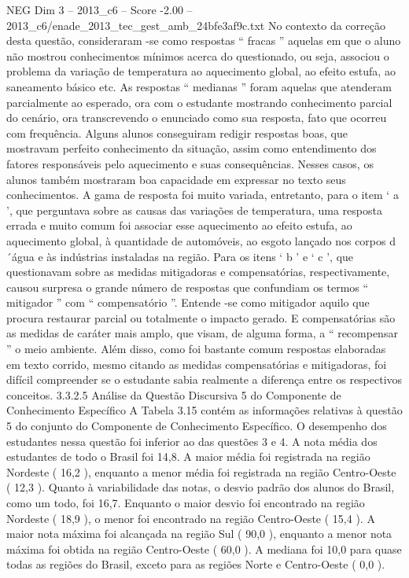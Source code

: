 \begin{textsample}{NEG Dim 3 – 2013\_c6 – Score -2.00 – 2013\_c6/enade\_2013\_tec\_gest\_amb\_24bfe3af9c.txt}
No contexto da correção desta questão, consideraram -se como respostas “ fracas ” aquelas em que o aluno não mostrou conhecimentos mínimos acerca do questionado, ou seja, associou o problema da variação de temperatura ao aquecimento global, ao efeito estufa, ao saneamento básico etc.
As respostas “ medianas ” foram aquelas que atenderam parcialmente ao esperado, ora com o estudante mostrando conhecimento parcial do cenário, ora transcrevendo o enunciado como sua resposta, fato que ocorreu com frequência.
Alguns alunos conseguiram redigir respostas boas, que mostravam perfeito conhecimento da situação, assim como entendimento dos fatores responsáveis pelo aquecimento e suas consequências.
Nesses casos, os alunos também mostraram boa capacidade em expressar no texto seus conhecimentos.
A gama de resposta foi muito variada, entretanto, para o item ‘ a ’, que perguntava sobre as causas das variações de temperatura, uma resposta errada e muito comum foi associar esse aquecimento ao efeito estufa, ao aquecimento global, à quantidade de automóveis, ao esgoto lançado nos corpos d´água e às indústrias instaladas na região.
Para os itens ‘ b ’ e ‘ c ’, que questionavam sobre as medidas mitigadoras e compensatórias, respectivamente, causou surpresa o grande número de respostas que confundiam os termos “ mitigador ” com “ compensatório ”.
Entende -se como mitigador aquilo que procura restaurar parcial ou totalmente o impacto gerado.
E compensatórias são as medidas de caráter mais amplo, que visam, de alguma forma, a “ recompensar ” o meio ambiente.
Além disso, como foi bastante comum respostas elaboradas em texto corrido, mesmo citando as medidas compensatórias e mitigadoras, foi difícil compreender se o estudante sabia realmente a diferença entre os respectivos conceitos. 3.3.2.5 Análise da Questão Discursiva 5 do Componente de Conhecimento Específico A Tabela 3.15 contém as informações relativas à questão 5 do conjunto do Componente de Conhecimento Específico.
O desempenho dos estudantes nessa questão foi inferior ao das questões 3 e 4.
A nota média dos estudantes de todo o Brasil foi 14,8.
A maior média foi registrada na região Nordeste ( 16,2 ), enquanto a menor média foi registrada na região Centro-Oeste ( 12,3 ).
Quanto à variabilidade das notas, o desvio padrão dos alunos do Brasil, como um todo, foi 16,7.
Enquanto o maior desvio foi encontrado na região Nordeste ( 18,9 ), o menor foi encontrado na região Centro-Oeste ( 15,4 ).
A maior nota máxima foi alcançada na região Sul ( 90,0 ), enquanto a menor nota máxima foi obtida na região Centro-Oeste ( 60,0 ).
A mediana foi 10,0 para quase todas as regiões do Brasil, exceto para as regiões Norte e Centro-Oeste ( 0,0 ).

\end{textsample}
